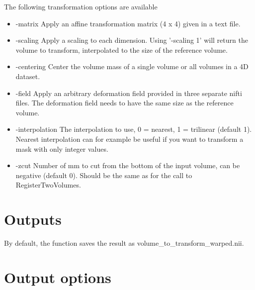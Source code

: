The following transformation options are available

\begin{itemize}

\item -matrix
\newline \newline Apply an affine transformation matrix (4 x 4) given in a text file.

\item -scaling
\newline \newline Apply a scaling to each dimension. Using '-scaling 1' will return the volume to transform, interpolated to the size of the reference volume.

\item -centering
\newline \newline Center the volume mass of a single volume or all volumes in a 4D dataset. 

\item -field
\newline \newline Apply an arbitrary deformation field provided in three separate nifti files. The deformation field needs to have the same size as the reference volume.

\item -interpolation
\newline \newline The interpolation to use, 0 = nearest, 1 = trilinear (default 1). Nearest interpolation can for example be useful if you want to transform a mask with only integer values.

\item -zcut
\newline \newline Number of mm to cut from the bottom of the input volume, can be negative (default 0). Should be the same as for the call to RegisterTwoVolumes.

\end{itemize}

\section{Outputs}

By default, the function saves the result as volume\_to\_transform\_warped.nii. 

\section{Output options}

